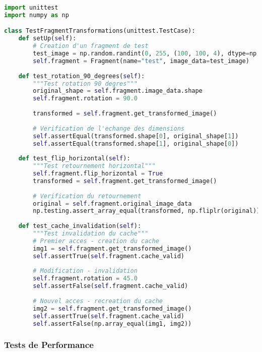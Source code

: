 \documentclass[12pt,a4paper]{article}
\begin{document}
\begin{lstlisting}[language=Python]
import unittest
import numpy as np

class TestFragmentTransformations(unittest.TestCase):
    def setUp(self):
        # Creation d'un fragment de test
        test_image = np.random.randint(0, 255, (100, 100, 4), dtype=np.uint8)
        self.fragment = Fragment(name="test", image_data=test_image)
    
    def test_rotation_90_degrees(self):
        """Test rotation 90 degres"""
        original_shape = self.fragment.image_data.shape
        self.fragment.rotation = 90.0
        
        transformed = self.fragment.get_transformed_image()
        
        # Verification de l'echange des dimensions
        self.assertEqual(transformed.shape[0], original_shape[1])
        self.assertEqual(transformed.shape[1], original_shape[0])
    
    def test_flip_horizontal(self):
        """Test retournement horizontal"""
        self.fragment.flip_horizontal = True
        transformed = self.fragment.get_transformed_image()
        
        # Verification du retournement
        original = self.fragment.original_image_data
        np.testing.assert_array_equal(transformed, np.fliplr(original))
    
    def test_cache_invalidation(self):
        """Test invalidation du cache"""
        # Premier acces - creation du cache
        img1 = self.fragment.get_transformed_image()
        self.assertTrue(self.fragment.cache_valid)
        
        # Modification - invalidation
        self.fragment.rotation = 45.0
        self.assertFalse(self.fragment.cache_valid)
        
        # Nouvel acces - recreation du cache
        img2 = self.fragment.get_transformed_image()
        self.assertTrue(self.fragment.cache_valid)
        self.assertFalse(np.array_equal(img1, img2))
\end{lstlisting}

\subsubsection{Tests de Performance}
\end{document}
